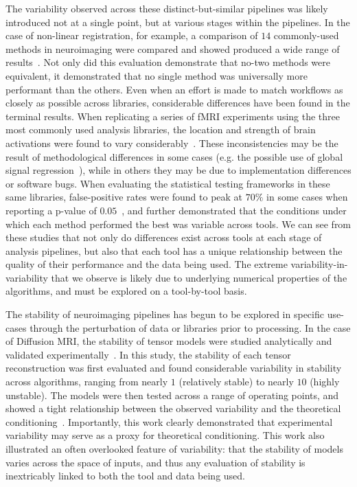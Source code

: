The variability observed across these distinct-but-similar pipelines was likely introduced not at a single point, but
at various stages within the pipelines. In the case of non-linear registration, for example, a comparison of $14$
commonly-used methods in neuroimaging were compared and showed produced a wide range of
results~\cite{klein2009evaluation}. Not only did this evaluation demonstrate that no-two methods were equivalent, it
demonstrated that no single method was universally more performant than the others. Even when an effort is made to
match workflows as closely as possible across libraries, considerable differences have been found in the terminal
results. When replicating a series of fMRI experiments using the three most commonly used analysis libraries, the
location and strength of brain activations were found to vary considerably~\cite{bowring2019exploring}. These
inconsistencies may be the result of methodological differences in some cases (e.g. the possible use of global signal
regression~\cite{murphy2017towards}), while in others they may be due to implementation differences or software bugs.
When evaluating the statistical testing frameworks in these same libraries, false-positive rates were found to peak at
$70\%$ in some cases when reporting a p-value of $0.05$~\cite{eklund2016cluster}, and further demonstrated that the
conditions under which each method performed the best was variable across tools. We can see from these studies that not
only do differences exist across tools at each stage of analysis pipelines, but also that each tool has a unique
relationship between the quality of their performance and the data being used. The extreme variability-in-variability
that we observe is likely due to underlying numerical properties of the algorithms, and must be explored on a
tool-by-tool basis.

The stability of neuroimaging pipelines has begun to be explored in specific use-cases through the perturbation of data
or libraries prior to processing. In the case of Diffusion MRI, the stability of tensor models were studied
analytically and validated experimentally~\cite{skare2000condition}. In this study, the stability of each tensor
reconstruction was first evaluated and found considerable variability in stability across algorithms, ranging from
nearly $1$ (relatively stable) to nearly $10$ (highly unstable). The models were then tested across a range of operating
points, and showed a tight relationship between the observed variability and the theoretical
conditioning~\cite{skare2000condition}. Importantly, this work clearly demonstrated that experimental variability may
serve as a proxy for theoretical conditioning. This work also illustrated an often overlooked feature of variability: that
the stability of models varies across the space of inputs, and thus any evaluation of stability is inextricably linked to
both the tool and data being used.

